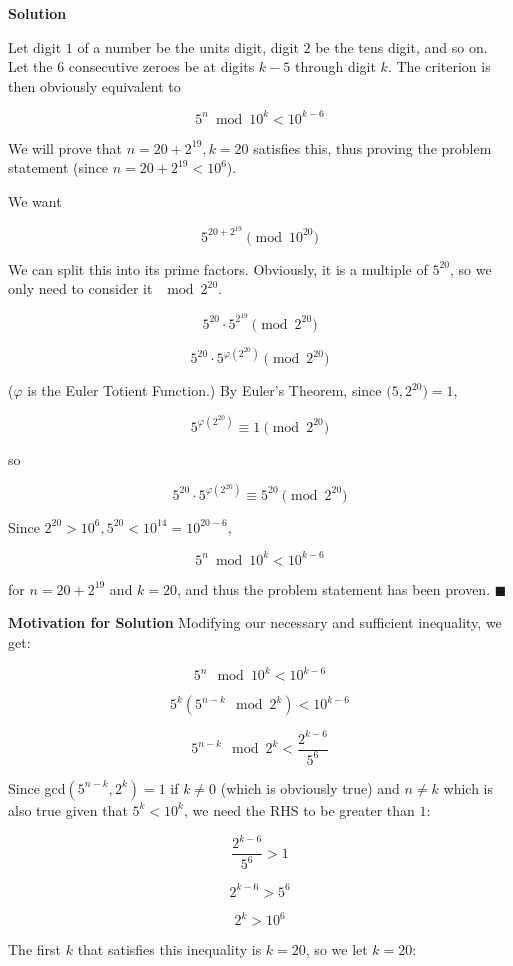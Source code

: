 \begin{enumerate}
 



\textbf{Solution}

Let digit $1$ of a number be the units digit, digit $2$ be the tens digit, and so on. Let the 6 consecutive zeroes be at digits $k-5$ through digit $k$. The criterion is then obviously equivalent to 

 
 \[5^n \bmod 10^k < 10^{k-6}\]

 We will prove that $n = 20+2^{19}, k = 20$ satisfies this, thus proving the problem statement (since $n = 20+2^{19} < 10^6$). 

 We want 

 
 \[5^{20+2^{19}}\pmod{10^{20}}\]

 We can split this into its prime factors. Obviously, it is a multiple of $5^{20}$, so we only need to consider it $\mod2^{20}$.

 
 \[5^{20}\cdot5^{2^{19}}\pmod{2^{20}}\]

 \[5^{20}\cdot5^{\varphi(2^{20})}\pmod{2^{20}}\]

 ($\varphi$ is the Euler Totient Function.) By Euler's Theorem, since $\bigl(5, 2^{20}\bigr)=1$, 

 
 \[5^{\varphi(2^{20})}\equiv1\pmod{2^{20}}\]

 so

 
 \[5^{20}\cdot5^{\varphi (2^{20})}\equiv5^{20}\pmod{2^{20}}\]

 Since $2^{20} > 10^6, 5^{20} < 10^{14} = 10^{20-6}$,

 
 \[5^n \bmod 10^k < 10^{k-6}\]

 for $n = 20+2^{19}$ and $k = 20$, and thus the problem statement has been proven. $\blacksquare$

 \textbf{Motivation for Solution} Modifying our necessary and sufficient inequality, we get:

 
 \[5^n \mod 10^k < 10^{k-6}\]

 \[5^k \left(5^{n-k} \mod 2^k\right) < 10^{k-6}\]

 \[5^{n-k} \mod 2^k < \frac{2^{k-6}}{5^6}\]

 Since gcd$\left(5^{n-k}, 2^k\right) = 1$ if $k \neq 0$ (which is obviously true) and $n \neq k$ which is also true given that $5^k < 10^k$, we need the RHS to be greater than $1$:

 
 \[\frac{2^{k-6}}{5^6} > 1\]

 \[2^{k-6} > 5^6\]

 \[2^k > 10^6\]

 The first $k$ that satisfies this inequality is $k = 20$, so we let $k = 20$:


\end{enumerate}
